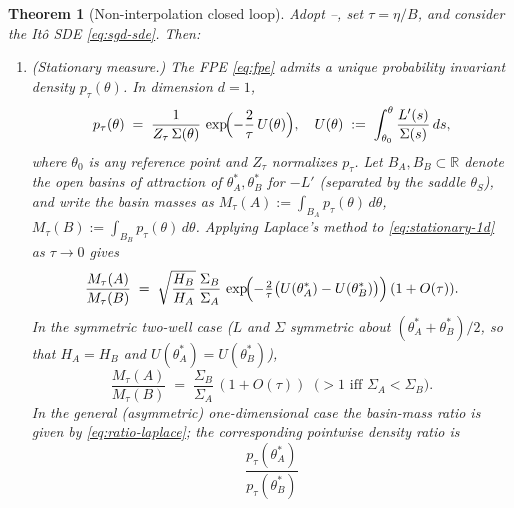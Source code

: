 \documentclass[11pt,a4paper]{article}
\newtheorem{theorem}{Theorem}[section]
\theoremstyle{definition}
\theoremstyle{remark}
\newcommand{\R}{\mathbb{R}}
\begin{document}
\begin{theorem}[Non-interpolation closed loop]\label{thm:closed-loop}
   Adopt --, set $\tau = \eta/B$, and consider
   the It\^o SDE \eqref{eq:sgd-sde}.  Then:
   \begin{enumerate}[label=\textnormal{(\Roman*)},leftmargin=2.6em]
   \item \emph{(Stationary measure.)}  The FPE \eqref{eq:fpe} admits a
       unique probability invariant density $p_\tau(\theta)$.  In dimension
       $d=1$,
       \begin{equation}\label{eq:stationary-1d}
          p_\tau(\theta) \;=\; \frac{1}{Z_\tau\,\Sigma(\theta)}\,
              \exp\!\Bigl(-\frac{2}{\tau}\,U(\theta)\Bigr),
          \quad
          U(\theta) \;:=\; \int_{\theta_0}^\theta
                 \frac{L'(s)}{\Sigma(s)}\,ds,
       \end{equation}
       where $\theta_0$ is any reference point and $Z_\tau$ normalizes
       $p_\tau$.  Let $B_A,B_B\subset\R$ denote the open basins of
       attraction of $\theta_A^*,\theta_B^*$ for $-L'$ (separated by
       the saddle $\theta_S$), and write the basin masses as
       $M_\tau(A) := \int_{B_A} p_\tau(\theta)\,d\theta$,
       $M_\tau(B) := \int_{B_B} p_\tau(\theta)\,d\theta$.  Applying
       Laplace's method to \eqref{eq:stationary-1d} as $\tau\to 0$ gives
       \begin{equation}\label{eq:ratio-laplace}
          \frac{M_\tau(A)}{M_\tau(B)}
          \;=\; \sqrt{\frac{H_B}{H_A}}\,\frac{\Sigma_B}{\Sigma_A}\,
                \exp\!\Bigl(-\tfrac{2}{\tau}\bigl(U(\theta_A^*)
                                                -U(\theta_B^*)\bigr)\Bigr)
                \,(1 + O(\tau)).
       \end{equation}
       In the symmetric two-well case ($L$ and $\Sigma$ symmetric about
       $(\theta_A^*+\theta_B^*)/2$, so that $H_A=H_B$ and
       $U(\theta_A^*)=U(\theta_B^*)$),
       \begin{equation}\label{eq:ratio-1d}
          \frac{M_\tau(A)}{M_\tau(B)}
          \;=\; \frac{\Sigma_B}{\Sigma_A}\,(1+O(\tau))
          \;\;\bigl(>1 \text{ iff } \Sigma_A<\Sigma_B\bigr).
       \end{equation}
       In the general (asymmetric) one-dimensional case the basin-mass
       ratio is given by \eqref{eq:ratio-laplace}; the corresponding
       \emph{pointwise} density ratio is
       \begin{equation}\label{eq:ratio-asym}
          \frac{p_\tau(\theta_A^*)}{p_\tau(\theta_B^*)}

\end{equation}
\end{enumerate}
\end{theorem}
\end{document}
